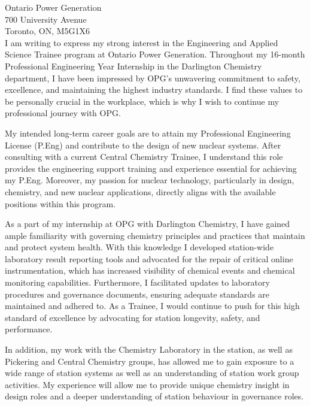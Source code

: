 \documentclass[11pt]{FDUletter}
\begin{document}
\begin{letter}{
    Ontario Power Generation \\
    700 University Avenue\\
    Toronto, ON, M5G1X6 \\
}
I am writing to express my strong interest in the Engineering and Applied Science Trainee program at Ontario Power Generation. Throughout my 16-month Professional Engineering Year Internship in the Darlington Chemistry department, I have been impressed by OPG's unwavering commitment to safety, excellence, and maintaining the highest industry standards. I find these values to be personally crucial in the workplace, which is why I wish to continue my professional journey with OPG.



My intended long-term career goals are to attain my Professional Engineering License (P.Eng) and contribute to the design of new nuclear systems. After consulting with a current Central Chemistry Trainee, I understand this role provides the engineering support training and experience essential for achieving my P.Eng. Moreover, my passion for nuclear technology, particularly in design, chemistry, and new nuclear applications, directly aligns with the available positions within this program.

As a part of my internship at OPG with Darlington Chemistry, I have gained ample familiarity with governing chemistry principles and practices that maintain and protect system health. With this knowledge I developed station-wide laboratory result reporting tools and advocated for the repair of critical online instrumentation, which has increased visibility of chemical events and chemical monitoring capabilities. Furthermore, I facilitated updates to laboratory procedures and governance documents, ensuring adequate standards are maintained and adhered to. As a Trainee, I would continue to push for this high standard of excellence by advocating for station longevity, safety, and performance.

In addition, my work with the Chemistry Laboratory in the station, as well as Pickering and Central Chemistry groups, has allowed me to gain exposure to a wide range of station systems as well as an understanding of station work group activities. My experience will allow me to provide unique chemistry insight in design roles and a deeper understanding of station behaviour in governance roles.


\end{letter}
\end{document}

